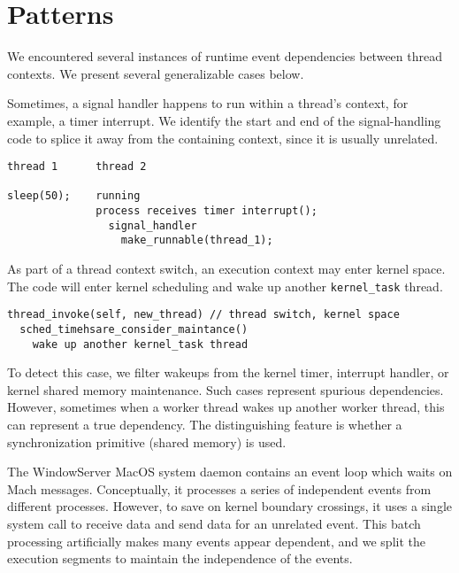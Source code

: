 \section{Patterns}
\label{sec:patterns}

We encountered several instances of runtime event dependencies between thread
contexts. We present several generalizable cases below.

Sometimes, a signal handler happens to run within a thread's context, for
example, a timer interrupt. We identify the start and end of the
signal-handling code to splice it away from the containing context, since it is
usually unrelated.

{\footnotesize \begin{verbatim}
thread 1      thread 2

sleep(50);    running
              process receives timer interrupt();
                signal_handler
                  make_runnable(thread_1);
\end{verbatim}
}

As part of a thread context switch, an execution context may enter kernel
space. The code will enter kernel scheduling and wake up another
\texttt{kernel\_task} thread.

{\footnotesize \begin{verbatim}
thread_invoke(self, new_thread) // thread switch, kernel space
  sched_timehsare_consider_maintance()
    wake up another kernel_task thread
\end{verbatim}
}

To detect this case, we filter wakeups from the kernel timer, interrupt
handler, or kernel shared memory maintenance. Such cases represent spurious
dependencies. However, sometimes when a worker thread wakes up another worker
thread, this can represent a true dependency. The distinguishing feature is
whether a synchronization primitive (shared memory) is used.

The WindowServer MacOS system daemon contains an event loop which waits on Mach
messages. Conceptually, it processes a series of independent events from
different processes. However, to save on kernel boundary crossings, it uses a
single system call to receive data and send data for an unrelated event. This
batch processing artificially makes many events appear dependent, and we split
the execution segments to maintain the independence of the events.

